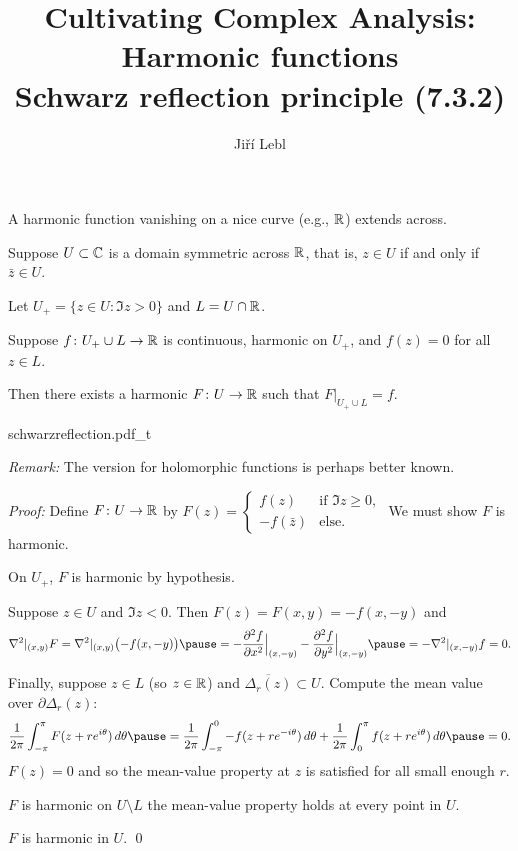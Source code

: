 \documentclass[10pt,aspectratio=169]{beamer}
\author{Ji\v{r}\'i Lebl}
\institute[OSU]{%
Departemento pri Matematiko de Oklahoma {\^S}tata Universitato}
\title{Cultivating Complex Analysis:\\%
Harmonic functions\\%
Schwarz reflection principle (7.3.2)}
\date{}
\begin{document}
\begin{frame}
\titlepage
\end{frame}

\begin{frame}
A harmonic function vanishing on a nice curve (e.g., ${\mathbb{R}}$) extends across.

\begin{theorem}%
Suppose $U \subset {\mathbb{C}}$ is a domain symmetric across ${\mathbb{R}}$, that is,
$z \in U$ if and only if $\bar{z} \in U$.

Let $U_+ = \{ z \in U : \Im z > 0 \}$ and $L = U \cap {\mathbb{R}}$.

Suppose $f \colon U_+ \cup L \to {\mathbb{R}}$ is continuous,
harmonic on $U_+$, and $f(z) = 0$ for all $z \in L$.

Then there exists a harmonic $F \colon U \to {\mathbb{R}}$ such that
$F|_{U_+ \cup L} = f$.
\end{theorem}

\begin{center}
{schwarzreflection.pdf_t}
\end{center}

\pause

\textit{Remark:} The version for holomorphic functions is perhaps better
known.

\end{frame}

\begin{frame}

\textit{Proof:}
Define $F \colon U \to {\mathbb{R}}$ by
\quad
$\displaystyle
F(z) =
\begin{cases}
f(z) & \text{if } \Im z \geq 0, \\
-f(\bar{z}) & \text{else} .
\end{cases}
$
\quad
We must show $F$ is harmonic.

\medskip
\pause

On $U_+$, $F$ is harmonic by hypothesis.

\medskip
\pause

Suppose $z \in U$ and $\Im z < 0$. \pause  Then $F(z) = F(x,y) = -f(x,-y)$ and
\[
\nabla^2|_{(x,y)} F
=
\nabla^2|_{(x,y)} \bigl( -f(x,-y) \bigr)
\pause
=
- \frac{\partial^2 f}{\partial x^2}\Big|_{(x,-y)}
- \frac{\partial^2 f}{\partial y^2}\Big|_{(x,-y)}
\pause
=
- \nabla^2|_{(x,-y)} f = 0 .
\]
\pause

Finally, suppose $z \in L$ (so $z \in {\mathbb{R}}$) and $\overline{\Delta_r(z)} \subset U$.
\pause
Compute the mean value over $\partial \Delta_r(z)$:
\[
\frac{1}{2\pi} \int_{-\pi}^{\pi} F(z+re^{i\theta})\, d\theta
\pause
=
\frac{1}{2\pi} \int_{-\pi}^{0} -f(z+re^{-i\theta})\, d\theta
+
\frac{1}{2\pi} \int_{0}^{\pi} f(z+re^{i\theta})\, d\theta
\pause
=
0 .
\]
\pause
$F(z)=0$ and so the 
mean-value property at $z$ is satisfied for all small enough
$r$.

\medskip
\pause

$F$ is harmonic on $U \setminus L$ \wthus the
mean-value property holds at every point in $U$.

\medskip
\pause

\thus \quad $F$ is harmonic in $U$.
\qed
\end{frame}
\end{document}
